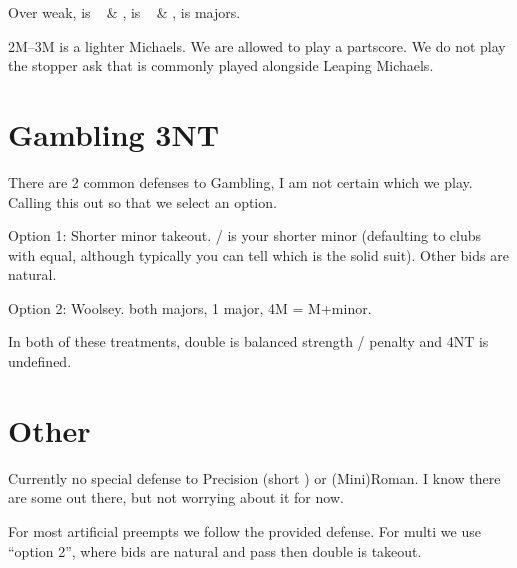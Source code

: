 \documentclass[main]{subfile}
\begin{document}
	Over  weak,  is \ccc~ \& \hhh,  is \ccc~ \& \sss,  is majors.
	
	2M--3M is a lighter Michaels. We are allowed to play a partscore. We do not play the stopper ask that is commonly played alongside Leaping Michaels.
		
	\section{Gambling 3NT}
	
	There are 2 common defenses to Gambling, I am not certain which we play. Calling this out so that we select an option.
	
	Option 1:  Shorter minor takeout. / is your shorter minor (defaulting to clubs with equal, although typically you can tell which is the solid suit). Other bids are natural.
	
	Option 2:  Woolsey.  both majors,  1 major, 4M = M+minor.
	
	In both of these treatments, double is balanced strength / penalty and 4NT is undefined.
	
	\section{Other}
	
	Currently no special defense to  Precision (short \ddd) or (Mini)Roman. I know there are some out there, but not worrying about it for now.
	
	For most artificial preempts we follow the provided defense. For multi we use ``option 2'', where bids are natural and pass then double is takeout.
	
\end{document}
